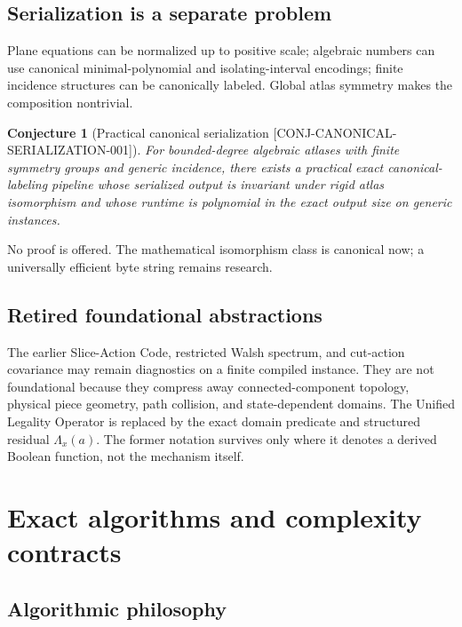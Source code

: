 \documentclass[11pt,openany]{book}
\newcommand{\claimid}[1]{\textnormal{\sffamily\footnotesize[#1]}}
\theoremstyle{polyplain}
\theoremstyle{polydef}
\newtheorem{conjecture}[theorem]{Conjecture}
\begin{document}
\section{Serialization is a separate problem}

Plane equations can be normalized up to positive scale; algebraic numbers can use canonical minimal-polynomial and isolating-interval encodings; finite incidence structures can be canonically labeled. Global atlas symmetry makes the composition nontrivial.

\begin{conjecture}[Practical canonical serialization \claimid{CONJ-CANONICAL-SERIALIZATION-001}]
\label{conj:canonical-serialization}
For bounded-degree algebraic atlases with finite symmetry groups and generic incidence, there exists a practical exact canonical-labeling pipeline whose serialized output is invariant under rigid atlas isomorphism and whose runtime is polynomial in the exact output size on generic instances.
\end{conjecture}

No proof is offered. The mathematical isomorphism class is canonical now; a universally efficient byte string remains research.

\section{Retired foundational abstractions}
\label{sec:retired-abstractions}

The earlier Slice-Action Code, restricted Walsh spectrum, and cut-action covariance may remain diagnostics on a finite compiled instance. They are not foundational because they compress away connected-component topology, physical piece geometry, path collision, and state-dependent domains. The Unified Legality Operator is replaced by the exact domain predicate and structured residual $\Lambda_x(a)$. The former notation survives only where it denotes a derived Boolean function, not the mechanism itself.


\chapter{Exact algorithms and complexity contracts}
\label{chap:algorithms}

\section{Algorithmic philosophy}
\end{document}
